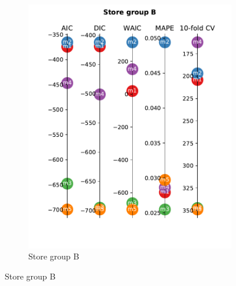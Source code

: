\documentclass[english, 12pt, a4paper, sci, utf8, a-1b, online]{aaltothesis}
\begin{document}
\begin{figure}
\begin{subfigure}[htb]{0.5\textwidth}
		\includegraphics[width=\textwidth]{../plots/metrics/metrics_plot_B.pdf}
		\caption{Store group B}
		\label{fig:metrics_B}
	\end{subfigure}
	

\end{figure}
\end{document}
